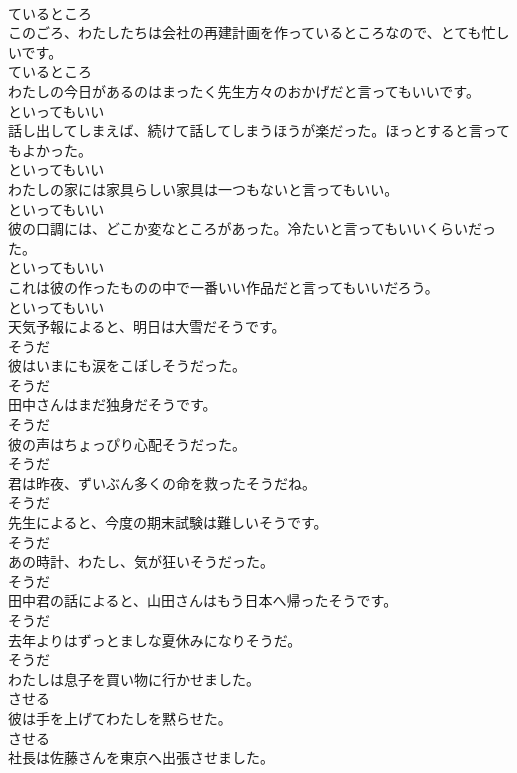 \documentclass[8pt]{extreport}
\begin{document}
\begin{CJK}{UTF8}{min}
\\	ているところ
\\	このごろ、わたしたちは会社の再建計画を作っているところなので、とても忙しいです。	
\\	ているところ
\\	わたしの今日があるのはまったく先生方々のおかげだと言ってもいいです。	
\\	といってもいい
\\	話し出してしまえば、続けて話してしまうほうが楽だった。ほっとすると言ってもよかった。	
\\	といってもいい
\\	わたしの家には家具らしい家具は一つもないと言ってもいい。	
\\	といってもいい
\\	彼の口調には、どこか変なところがあった。冷たいと言ってもいいくらいだった。	
\\	といってもいい
\\	これは彼の作ったものの中で一番いい作品だと言ってもいいだろう。	
\\	といってもいい
\\	天気予報によると、明日は大雪だそうです。	
\\	そうだ
\\	彼はいまにも涙をこぼしそうだった。	
\\	そうだ
\\	田中さんはまだ独身だそうです。	
\\	そうだ
\\	彼の声はちょっぴり心配そうだった。	
\\	そうだ
\\	君は昨夜、ずいぶん多くの命を救ったそうだね。	
\\	そうだ
\\	先生によると、今度の期末試験は難しいそうです。	
\\	そうだ
\\	あの時計、わたし、気が狂いそうだった。	
\\	そうだ
\\	田中君の話によると、山田さんはもう日本へ帰ったそうです。	
\\	そうだ
\\	去年よりはずっとましな夏休みになりそうだ。	
\\	そうだ
\\	わたしは息子を買い物に行かせました。	
\\	させる
\\	彼は手を上げてわたしを黙らせた。	
\\	させる
\\	社長は佐藤さんを東京へ出張させました。	

\end{CJK}
\end{document}
